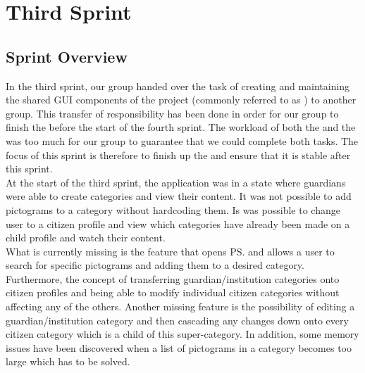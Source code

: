 \part{Third Sprint}
\label{par:third_sprint}

\chapter{Sprint Overview}
In the third sprint, our group handed over the task of creating and maintaining the shared GUI components of the project (commonly referred to as \gc) to another group. This transfer of responsibility has been done in order for our group to finish the \ct before the start of the fourth sprint. The workload of both the \ct and the \gc was too much for our group to guarantee that we could complete both tasks. The focus of this sprint is therefore to finish up the \ct and ensure that it is stable after this sprint.\\

At the start of the third sprint, the application was in a state where guardians were able to create categories and view their content. It was not possible to add pictograms to a category without hardcoding them. Is was possible to change user to a citizen profile and view which categories have already been made on a child profile and watch their content. \\

What is currently missing is the feature that opens \ps and allows a user to search for specific pictograms and adding them to a desired category. Furthermore, the concept of transferring guardian/institution categories onto citizen profiles and being able to modify individual citizen categories without affecting any of the others. Another missing feature is the possibility of editing a guardian/institution category and then cascading any changes down onto every citizen category which is a child of this super-category. In addition, some memory issues have been discovered when a list of pictograms in a category becomes too large which has to be solved. 




